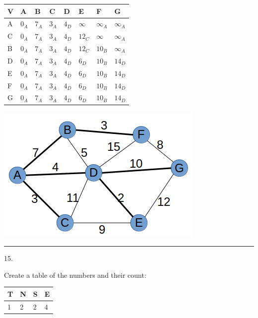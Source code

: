 \documentclass{article}
\begin{document}
\begin{table}[H]
\begin{tabular}{|l|l|l|l|l|l|l|l|}
\hline
V & \textbf{A} & \textbf{B} & \textbf{C} & \textbf{D} & \textbf{E} & \textbf{F} & \textbf{G} \\ \hline
A & $0_A$ & $7_A$ & $3_A$ & $4_D$ & $\infty$ & $\infty_A$ & $\infty_A$ \\ \hline
C & $0_A$ & $7_A$ & $3_A$ & $4_D$ & $12_C$ & $\infty$ & $\infty_A$ \\ \hline
B & $0_A$ & $7_A$ & $3_A$ & $4_D$ & $12_C$ & $10_B$ & $\infty_A$ \\ \hline
D & $0_A$ & $7_A$ & $3_A$ & $4_D$ & $6_D$ & $10_B$ & $14_D$ \\ \hline
E & $0_A$ & $7_A$ & $3_A$ & $4_D$ & $6_D$ & $10_B$ & $14_D$ \\ \hline
F & $0_A$ & $7_A$ & $3_A$ & $4_D$ & $6_D$ & $10_B$ & $14_D$ \\ \hline
G & $0_A$ & $7_A$ & $3_A$ & $4_D$ & $6_D$ & $10_B$ & $14_D$ \\ \hline
\end{tabular}
\end{table}


\includegraphics[scale=0.5]{./P14/final}






\noindent\rule{8cm}{0.4pt}


15.  

Create a table of the numbers and their count:

\begin{table}[H]
\begin{tabular}{|l|l|l|l|}
\hline
T & N & S & E \\ \hline
1 & 2 & 2 & 4 \\ \hline
\end{tabular}
\end{table}
\end{document}
